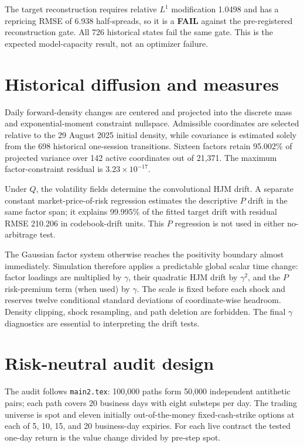 \documentclass[11pt]{article}
\newcommand{\fail}{\textcolor{warnred}{\textbf{FAIL}}}
\begin{document}
The target reconstruction requires relative $L^1$ modification 1.0498 and
has a repricing RMSE of 6.938 half-spreads, so it is a \fail{} against the
pre-registered reconstruction gate.  All 726 historical states fail the same
gate.  This is the expected model-capacity result, not an optimizer failure.

\section{Historical diffusion and measures}

Daily forward-density changes are centered and projected into the discrete
mass and exponential-moment constraint nullspace.  Admissible coordinates are
selected relative to the 29 August 2025 initial density, while covariance is
estimated solely from the 698 historical one-session transitions.  Sixteen
factors retain 95.002\% of projected variance over 142 active coordinates out
of 21,371.  The maximum factor-constraint residual is
$3.23\times10^{-17}$.

Under $Q$, the volatility fields determine the convolutional HJM drift.  A
separate constant market-price-of-risk regression estimates the descriptive
$P$ drift in the same factor span; it explains 99.995\% of the fitted target
drift with residual RMSE 210.206 in codebook-drift units.  This $P$ regression
is not used in either no-arbitrage test.

The Gaussian factor system otherwise reaches the positivity boundary almost
immediately.  Simulation therefore applies a predictable global scalar time
change: factor loadings are multiplied by $\gamma$, their quadratic HJM drift
by $\gamma^2$, and the $P$ risk-premium term (when used) by $\gamma$.  The
scale is fixed before each shock and reserves twelve conditional standard
deviations of coordinate-wise headroom.  Density clipping, shock resampling,
and path deletion are forbidden.  The final $\gamma$ diagnostics are essential
to interpreting the drift tests.

\section{Risk-neutral audit design}

The audit follows \texttt{main2.tex}: 100,000 paths form 50,000 independent
antithetic pairs; each path covers 20 business days with eight substeps per
day.  The trading universe is spot and eleven initially out-of-the-money
fixed-cash-strike options at each of 5, 10, 15, and 20 business-day expiries.
For each live contract the tested one-day return is the value change divided
by pre-step spot.
\end{document}
